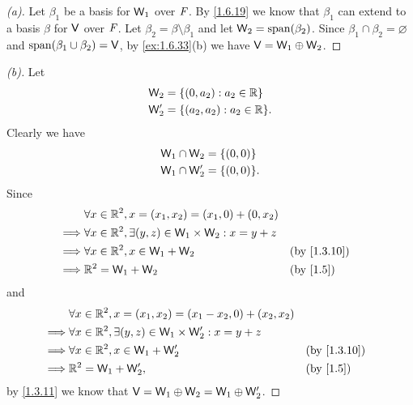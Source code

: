 \begin{proof}[(a)]
  Let \(\beta_1\) be a basis for \(\mathsf{W}_1\) over \(\mathit{F}\).
  By \cref{1.6.19} we know that \(\beta_1\) can extend to a basis \(\beta\) for \(\mathsf{V}\) over \(\mathit{F}\).
  Let \(\beta_2 = \beta \setminus \beta_1\) and let \(\W_2 = \spn{\beta_2}\).
  Since \(\beta_1 \cap \beta_2 = \varnothing\) and \(\spn{\beta_1 \cup \beta_2} = \V\), by \cref{ex:1.6.33}(b) we have \(\mathsf{V} = \mathsf{W}_1 \oplus \mathsf{W}_2\).
\end{proof}

\begin{proof}[(b)]
  Let
  \begin{align*}
    \W_2  & = \set{(0, a_2) : a_2 \in \R}    \\
    \W_2' & = \set{(a_2, a_2) : a_2 \in \R}.
  \end{align*}
  Clearly we have
  \begin{align*}
    \W_1 \cap \W_2  & = \set{(0, 0)}  \\
    \W_1 \cap \W_2' & = \set{(0, 0)}.
  \end{align*}
  Since
  \begin{align*}
             & \forall x \in \R^2, x = (x_1, x_2) = (x_1, 0) + (0, x_2)                                           \\
    \implies & \forall x \in \R^2, \exists (y, z) \in \W_1 \times \W_2 : x = y + z                                \\
    \implies & \forall x \in \R^2, x \in \W_1 + \W_2                               &  & \text{(by \cref{1.3.10})} \\
    \implies & \R^2 = \W_1 + \W_2                                                  &  & \text{(by \cref{1.5})}
  \end{align*}
  and
  \begin{align*}
             & \forall x \in \R^2, x = (x_1, x_2) = (x_1 - x_2, 0) + (x_2, x_2)                                    \\
    \implies & \forall x \in \R^2, \exists (y, z) \in \W_1 \times \W_2' : x = y + z                                \\
    \implies & \forall x \in \R^2, x \in \W_1 + \W_2'                               &  & \text{(by \cref{1.3.10})} \\
    \implies & \R^2 = \W_1 + \W_2',                                                 &  & \text{(by \cref{1.5})}
  \end{align*}
  by \cref{1.3.11} we know that \(\mathsf{V} = \mathsf{W}_1 \oplus \mathsf{W}_2 = \mathsf{W}_1 \oplus \mathsf{W}_2'\).
\end{proof}

